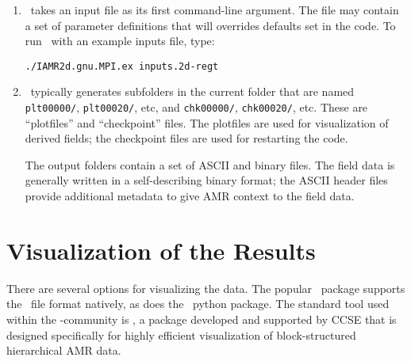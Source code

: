 \begin{enumerate}

\item \iamr\ takes an input file as its first command-line argument.  The file may
contain a set of parameter definitions that will overrides defaults set in the code.
  To run \iamr\ with an example inputs file, type:
\begin{verbatim}
./IAMR2d.gnu.MPI.ex inputs.2d-regt
\end{verbatim}

\item \iamr\ typically generates subfolders in the current folder that
  are named {\tt plt00000/}, {\tt plt00020/}, etc, and {\tt chk00000/},
  {\tt chk00020/}, etc. These are ``plotfiles'' and ``checkpoint''
  files. The plotfiles are used for visualization of derived fields; the checkpoint
  files are used for restarting the code.

  The output folders contain a set of ASCII and binary files.  The field
  data is generally written in a self-describing binary format; the 
  ASCII header files provide additional metadata to give AMR context to the field data.

\end{enumerate}

\section{Visualization of the Results}

There are several options for visualizing the data.  The popular
\visit\ package supports the \amrex\ file format natively, as does
the \yt\ python package.  The standard tool used within the
\amrex-community is \amrvis, a package developed and supported 
by CCSE that is designed specifically for highly efficient visualization
of block-structured hierarchical AMR data.


